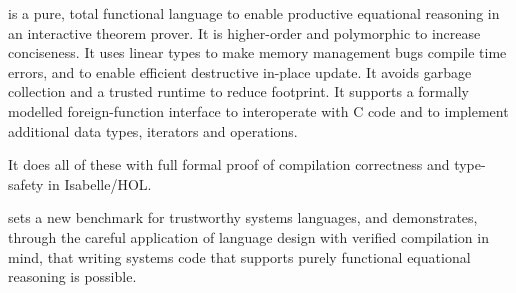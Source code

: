 \documentclass[9pt\ifFinal\else,preprint,nocopyrightspace\fi,\ifAlpha\else natbib,authoryear\fi]{sigplanconf}
\begin{document}
\cdsl is a pure, total functional language to enable productive equational
reasoning in an interactive theorem prover. It is higher-order and
polymorphic to increase conciseness. It uses linear types to make memory
management bugs compile time errors, and to enable efficient destructive
in-place update. It avoids garbage collection and a trusted runtime to reduce
footprint. It supports a formally modelled foreign-function interface to
interoperate with C code and to implement additional data types, iterators
and operations.

It does all of these with full formal proof of compilation correctness
and type-safety in Isabelle/HOL.

\CDSL sets a new benchmark for trustworthy systems languages, and
demonstrates, through the careful application of language design
with verified compilation in mind, that writing systems code that
supports purely functional equational reasoning is possible.




\balance
{
  \Finalfalse

  \ifAlpha
    
  \else
    
  \fi
  \ifFinal
  \else
    
  \fi
}
\end{document}
